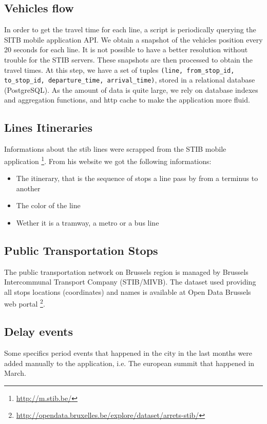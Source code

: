 \documentclass[11pt]{article}%
\begin{document}
\begin{minipage}{0.7\textwidth}
  \subsection{Vehicles flow}
  In order to get the travel time for each line, a script is periodically querying the SITB mobile application API. We obtain a snapshot of the vehicles position every 20 seconds for each line. It is not possible to have a better resolution without trouble for the STIB servers. These snapshots are then processed to obtain the travel times. At this step, we have a set of tuples \texttt{(line, from\_stop\_id, to\_stop\_id, departure\_time, arrival\_time)}, stored in a relational database (PostgreSQL). As the amount of data is quite large, we rely on database indexes and aggregation functions, and http cache to make the application more fluid.

  \subsection{Lines Itineraries}
Informations about the stib lines were scrapped from the STIB mobile application \footnote{\url{http://m.stib.be/}}. From his website we got the following informations:
\begin{itemize}
    \item The itinerary, that is the sequence of stops a line pass by from a terminus to another
    \item The color of the line
    \item Wether it is a tramway, a metro or a bus line
\end{itemize}
\end{minipage}

\subsection{Public Transportation Stops}
The public transportation network on Brussels region is managed by Brussels Intercommunal Transport Company (STIB/MIVB). The dataset used providing all stops locations (coordinates) and names is available at Open Data Brussels web portal \footnote{\url{http://opendata.bruxelles.be/explore/dataset/arrets-stib/}}.

\subsection{Delay events}
Some specifics period events that happened in the city in the last months were added manually to the application, i.e. The european summit that happened in March.                       
                       
\end{document}
